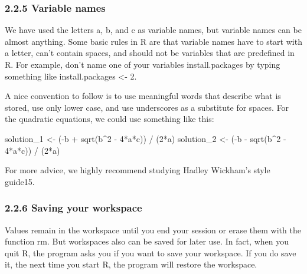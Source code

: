 \documentclass[
]{article}
\newenvironment{Shaded}{\begin{snugshade}}{\end{snugshade}}
\newcommand{\DecValTok}[1]{\textcolor[rgb]{0.00,0.00,0.81}{#1}}
\newcommand{\FunctionTok}[1]{\textcolor[rgb]{0.00,0.00,0.00}{#1}}
\newcommand{\NormalTok}[1]{#1}
\newcommand{\OtherTok}[1]{\textcolor[rgb]{0.56,0.35,0.01}{#1}}
\newcommand{\SpecialCharTok}[1]{\textcolor[rgb]{0.00,0.00,0.00}{#1}}
\begin{document}
\hypertarget{variable-names}{%
\subsubsection{2.2.5 Variable names}\label{variable-names}}

We have used the letters a, b, and c as variable names, but variable
names can be almost anything. Some basic rules in R are that variable
names have to start with a letter, can't contain spaces, and should not
be variables that are predefined in R. For example, don't name one of
your variables install.packages by typing something like
install.packages \textless- 2.

A nice convention to follow is to use meaningful words that describe
what is stored, use only lower case, and use underscores as a substitute
for spaces. For the quadratic equations, we could use something like
this:

\begin{Shaded}
\begin{Highlighting}[]
\NormalTok{solution\_1 }\OtherTok{\textless{}{-}}\NormalTok{ (}\SpecialCharTok{{-}}\NormalTok{b }\SpecialCharTok{+} \FunctionTok{sqrt}\NormalTok{(b}\SpecialCharTok{\^{}}\DecValTok{2} \SpecialCharTok{{-}} \DecValTok{4}\SpecialCharTok{*}\NormalTok{a}\SpecialCharTok{*}\NormalTok{c)) }\SpecialCharTok{/}\NormalTok{ (}\DecValTok{2}\SpecialCharTok{*}\NormalTok{a)}
\NormalTok{solution\_2 }\OtherTok{\textless{}{-}}\NormalTok{ (}\SpecialCharTok{{-}}\NormalTok{b }\SpecialCharTok{{-}} \FunctionTok{sqrt}\NormalTok{(b}\SpecialCharTok{\^{}}\DecValTok{2} \SpecialCharTok{{-}} \DecValTok{4}\SpecialCharTok{*}\NormalTok{a}\SpecialCharTok{*}\NormalTok{c)) }\SpecialCharTok{/}\NormalTok{ (}\DecValTok{2}\SpecialCharTok{*}\NormalTok{a)}
\end{Highlighting}
\end{Shaded}

For more advice, we highly recommend studying Hadley Wickham's style
guide15.

\hypertarget{saving-your-workspace}{%
\subsubsection{2.2.6 Saving your
workspace}\label{saving-your-workspace}}

Values remain in the workspace until you end your session or erase them
with the function rm. But workspaces also can be saved for later use. In
fact, when you quit R, the program asks you if you want to save your
workspace. If you do save it, the next time you start R, the program
will restore the workspace.
\end{document}
